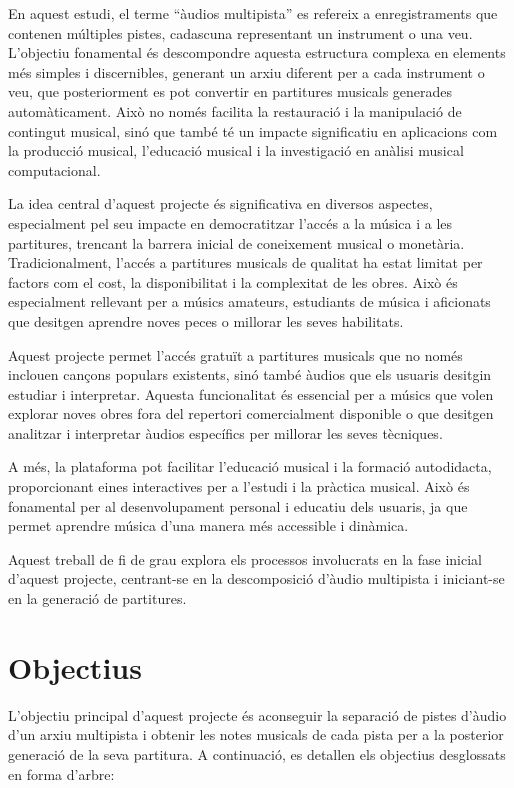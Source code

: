 \documentclass[10pt,a4paper,twocolumn,twoside]{article}
\begin{document}
En aquest estudi, el terme ``àudios multipista'' es refereix a enregistraments que contenen múltiples pistes, cadascuna representant un instrument o una veu. L'objectiu fonamental és descompondre aquesta estructura complexa en elements més simples i discernibles, generant un arxiu diferent per a cada instrument o veu, que posteriorment es pot convertir en partitures musicals generades automàticament. Això no només facilita la restauració i la manipulació de contingut musical, sinó que també té un impacte significatiu en aplicacions com la producció musical, l'educació musical i la investigació en anàlisi musical computacional.

La idea central d'aquest projecte és significativa en diversos aspectes, especialment pel seu impacte en democratitzar l'accés a la música i a les partitures, trencant la barrera inicial de coneixement musical o monetària. Tradicionalment, l'accés a partitures musicals de qualitat ha estat limitat per factors com el cost, la disponibilitat i la complexitat de les obres. Això és especialment rellevant per a músics amateurs, estudiants de música i aficionats que desitgen aprendre noves peces o millorar les seves habilitats.

Aquest projecte permet l'accés gratuït a partitures musicals que no només inclouen cançons populars existents, sinó també àudios que els usuaris desitgin estudiar i interpretar. Aquesta funcionalitat és essencial per a músics que volen explorar noves obres fora del repertori comercialment disponible o que desitgen analitzar i interpretar àudios específics per millorar les seves tècniques.

A més, la plataforma pot facilitar l'educació musical i la formació autodidacta, proporcionant eines interactives per a l'estudi i la pràctica musical. Això és fonamental per al desenvolupament personal i educatiu dels usuaris, ja que permet aprendre música d'una manera més accessible i dinàmica.

Aquest treball de fi de grau explora els processos involucrats en la fase inicial d'aquest projecte, centrant-se en la descomposició d'àudio multipista i iniciant-se en la generació de partitures.



\section{Objectius}
\label{sec:objectius}

L'objectiu principal d'aquest projecte és aconseguir la separació de pistes d'àudio d'un arxiu multipista i obtenir les notes musicals de cada pista per a la posterior generació de la seva partitura. A continuació, es detallen els objectius desglossats en forma d'arbre:
\end{document}
